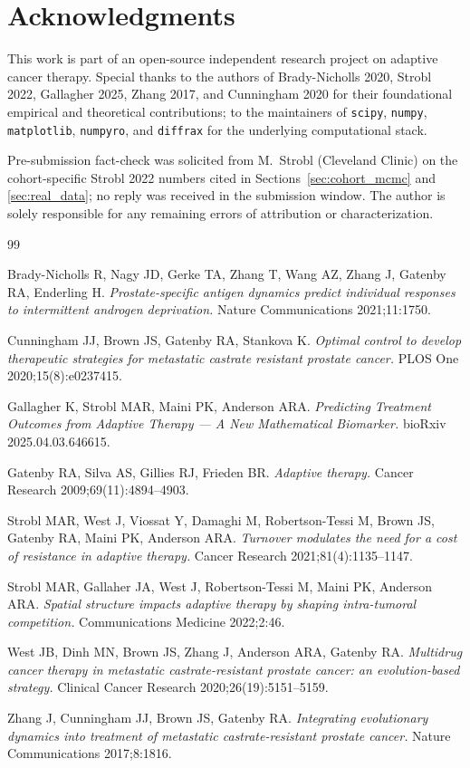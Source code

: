\documentclass[11pt]{article}
\begin{document}
\section*{Acknowledgments}

This work is part of an open-source independent research project on adaptive
cancer therapy. Special thanks to the authors of Brady-Nicholls 2020, Strobl
2022, Gallagher 2025, Zhang 2017, and Cunningham 2020 for their foundational
empirical and theoretical contributions; to the maintainers of \texttt{scipy},
\texttt{numpy}, \texttt{matplotlib}, \texttt{numpyro}, and \texttt{diffrax} for
the underlying computational stack.

Pre-submission fact-check was solicited from M.~Strobl (Cleveland Clinic) on
the cohort-specific Strobl 2022 numbers cited in Sections~\ref{sec:cohort_mcmc}
and \ref{sec:real_data}; no reply was received in the submission window. The
author is solely responsible for any remaining errors of attribution or
characterization.

\begin{thebibliography}{99}

Brady-Nicholls R, Nagy JD, Gerke TA, Zhang T, Wang AZ, Zhang J, Gatenby RA,
Enderling H. \emph{Prostate-specific antigen dynamics predict individual
responses to intermittent androgen deprivation.} Nature Communications
2021;11:1750.

Cunningham JJ, Brown JS, Gatenby RA, Stankova K. \emph{Optimal control to
develop therapeutic strategies for metastatic castrate resistant prostate
cancer.} PLOS One 2020;15(8):e0237415.

Gallagher K, Strobl MAR, Maini PK, Anderson ARA. \emph{Predicting Treatment
Outcomes from Adaptive Therapy --- A New Mathematical Biomarker.} bioRxiv
2025.04.03.646615.

Gatenby RA, Silva AS, Gillies RJ, Frieden BR. \emph{Adaptive therapy.} Cancer
Research 2009;69(11):4894--4903.

Strobl MAR, West J, Viossat Y, Damaghi M, Robertson-Tessi M, Brown JS, Gatenby
RA, Maini PK, Anderson ARA. \emph{Turnover modulates the need for a cost of
resistance in adaptive therapy.} Cancer Research 2021;81(4):1135--1147.

Strobl MAR, Gallaher JA, West J, Robertson-Tessi M, Maini PK, Anderson ARA.
\emph{Spatial structure impacts adaptive therapy by shaping intra-tumoral
competition.} Communications Medicine 2022;2:46.

West JB, Dinh MN, Brown JS, Zhang J, Anderson ARA, Gatenby RA. \emph{Multidrug
cancer therapy in metastatic castrate-resistant prostate cancer: an
evolution-based strategy.} Clinical Cancer Research 2020;26(19):5151--5159.

Zhang J, Cunningham JJ, Brown JS, Gatenby RA. \emph{Integrating evolutionary
dynamics into treatment of metastatic castrate-resistant prostate cancer.}
Nature Communications 2017;8:1816.

\end{thebibliography}
\end{document}
